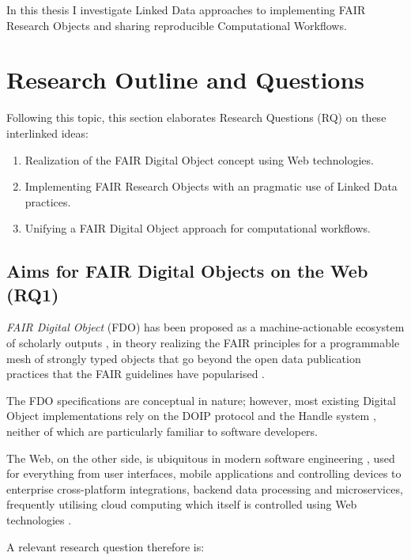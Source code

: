 In this thesis I investigate Linked Data approaches to implementing FAIR Research Objects and sharing reproducible Computational Workflows.

\section{Research Outline and Questions}
\label{intro:outline}

Following this topic, this section elaborates Research Questions (RQ) on these interlinked ideas:

\begin{enumerate}
    \item Realization of the FAIR Digital Object concept using Web technologies.
    \item Implementing FAIR Research Objects with an pragmatic use of Linked Data practices.
    \item Unifying a FAIR Digital Object approach for computational workflows.
\end{enumerate}


\subsection{Aims for FAIR Digital Objects on the Web (RQ1)}
\label{intro:rq1}

\emph{FAIR Digital Object} (FDO) has been proposed as a machine-actionable ecosystem of scholarly outputs \cite{Schultes 2019}, in theory realizing the FAIR principles \cite{Wilkinson 2016} for a programmable mesh of strongly typed objects that go beyond the open data publication practices that the FAIR guidelines have popularised \cite{Jacobsen 2020}.

The FDO specifications \cite{Ivonne 2023} are conceptual in nature; however, most existing Digital Object implementations \cite{Kahn 2006} rely on the DOIP protocol \cite{Reilly 2009} and the Handle system \cite{Sun 2003a}, neither of which are particularly familiar to software developers.

The Web, on the other side, is ubiquitous in modern software engineering \cite{Taivalsaari 2021}, used for everything from user interfaces, mobile applications and controlling devices to enterprise cross-platform integrations, backend data processing and microservices, frequently utilising cloud computing which itself is controlled using Web technologies \cite{Marinescu 2023}.

A relevant research question therefore is: 

